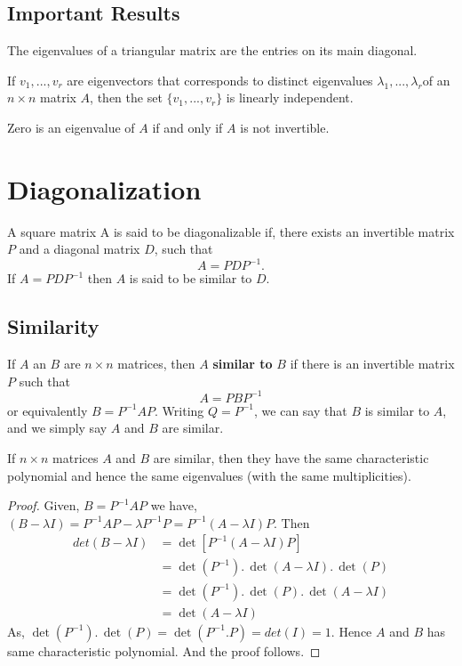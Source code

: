 \documentclass[aima104_lecturenotes_ku.tex]{subfiles}
\begin{document}
\subsection{Important Results}
\begin{theorem}
  The eigenvalues of a triangular matrix are the entries on its main diagonal.
\end{theorem}

\begin{theorem}
  If $v_1, ..., v_r$ are eigenvectors that corresponds to distinct eigenvalues $\lambda _1, ..., \lambda _r$of an $n \times n$ matrix $A$, then the set $\{v_1, ..., v_r\}$ is linearly independent.
  \end{theorem}

  \begin{theorem}
    Zero is an eigenvalue of $A$ if and only if $A$ is not invertible.
  \end{theorem}
\section{Diagonalization}
\begin{mdframed}
  A square matrix A is said to be diagonalizable if, there exists an invertible matrix $P$ and a diagonal matrix $D$, such that $$A = PDP^{-1}.$$ If $A = PDP^{-1}$ then $A$ is said to be similar to $D$.
\end{mdframed}

\subsection{Similarity}
If $A$ an $B$ are $n \times n$ matrices, then $A$ \textbf{similar to} $B$ if there is an invertible matrix $P$ such that $$A = PBP^{-1}$$ or equivalently $B=P^{-1}AP$. Writing $Q=P^{-1}$, we can say that $B$ is similar to $A$, and we simply say $A$ and $B$ are similar.
\begin{theorem}
  If $n \times n$ matrices $A$ and $B$ are similar, then they have the same characteristic polynomial and hence the same eigenvalues (with the same multiplicities).
\end{theorem}
\begin{proof}
 \hspace{1cm} Given, $B=P^{-1}AP$ we have, $(B-\lambda I) = P^{-1}AP - \lambda P^{-1}P = P^{-1}(A- \lambda I) P$. Then
    \begin{align*}
      det(B-\lambda I) &= \det[P^{-1}(A- \lambda I) P] \\
                       &= \det(P^{-1}).\, \det(A- \lambda I).\, \det(P) \\
                       &= \det(P^{-1}).\, \det(P). \, \det(A- \lambda I) \\
                       &= \det(A- \lambda I)
    \end{align*}
  As, $\det(P^{-1}).\, \det(P) = \det(P^{-1}.P)=det(I) = 1$. Hence $A$ and $B$ has same characteristic polynomial. And the proof follows.
\end{proof}
\end{document}
